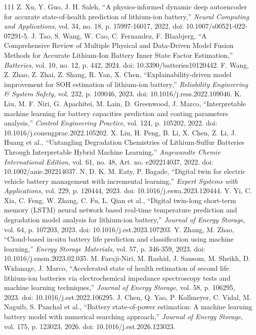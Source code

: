 \documentclass[journal]{IEEEtran}
\begin{document}
\begin{thebibliography}{111}
Z. Xu, Y. Guo, J. H. Saleh, ``A physics-informed dynamic deep autoencoder for accurate state-of-health prediction of lithium-ion battery,'' \emph{Neural Computing and Applications}, vol. 34, no. 18, p. 15997-16017, 2022. doi: 10.1007/s00521-022-07291-5.
J. Tao, S. Wang, W. Cao, C. Fernandez, F. Blaabjerg, ``A Comprehensive Review of Multiple Physical and Data-Driven Model Fusion Methods for Accurate Lithium-Ion Battery Inner State Factor Estimation,'' \emph{Batteries}, vol. 10, no. 12, p. 442, 2024. doi: 10.3390/batteries10120442.
F. Wang, Z. Zhao, Z. Zhai, Z. Shang, R. Yan, X. Chen, ``Explainability-driven model improvement for SOH estimation of lithium-ion battery,'' \emph{Reliability Engineering \& System Safety}, vol. 232, p. 109046, 2023. doi: 10.1016/j.ress.2022.109046.
K. Liu, M. F. Niri, G. Apachitei, M. Lain, D. Greenwood, J. Marco, ``Interpretable machine learning for battery capacities prediction and coating parameters analysis,'' \emph{Control Engineering Practice}, vol. 124, p. 105202, 2022. doi: 10.1016/j.conengprac.2022.105202.
X. Liu, H. Peng, B. Li, X. Chen, Z. Li, J. Huang et al., ``Untangling Degradation Chemistries of Lithium‐Sulfur Batteries Through Interpretable Hybrid Machine Learning,'' \emph{Angewandte Chemie International Edition}, vol. 61, no. 48, Art. no. e202214037, 2022. doi: 10.1002/anie.202214037.
N. D. K. M. Eaty, P. Bagade, ``Digital twin for electric vehicle battery management with incremental learning,'' \emph{Expert Systems with Applications}, vol. 229, p. 120444, 2023. doi: 10.1016/j.eswa.2023.120444.
Y. Yi, C. Xia, C. Feng, W. Zhang, C. Fu, L. Qian et al., ``Digital twin-long short-term memory (LSTM) neural network based real-time temperature prediction and degradation model analysis for lithium-ion battery,'' \emph{Journal of Energy Storage}, vol. 64, p. 107203, 2023. doi: 10.1016/j.est.2023.107203.
Y. Zhang, M. Zhao, ``Cloud-based in-situ battery life prediction and classification using machine learning,'' \emph{Energy Storage Materials}, vol. 57, p. 346-359, 2023. doi: 10.1016/j.ensm.2023.02.035.
M. Faraji-Niri, M. Rashid, J. Sansom, M. Sheikh, D. Widanage, J. Marco, ``Accelerated state of health estimation of second life lithium-ion batteries via electrochemical impedance spectroscopy tests and machine learning techniques,'' \emph{Journal of Energy Storage}, vol. 58, p. 106295, 2023. doi: 10.1016/j.est.2022.106295.
J. Chen, Q. Yao, P. Kollmeyer, C. Vidal, M. Naguib, S. Panchal et al., ``Battery state-of-power estimation: A machine learning battery model with numerical searching approach,'' \emph{Journal of Energy Storage}, vol. 175, p. 123023, 2026. doi: 10.1016/j.est.2026.123023.

\end{thebibliography}
\end{document}
